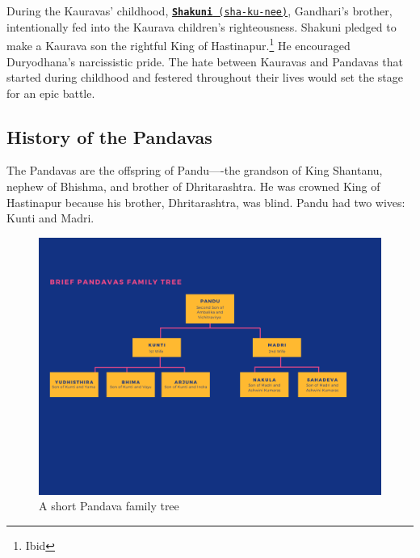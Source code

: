 \documentclass[10pt, letterpaper]{article}
\begin{document}
During the Kauravas' childhood,
\texttt{\underline{\href{https://drive.google.com/file/d/1W6-9A5tCvrCfKQBv-zHQ1JtPp9EI0-eM/view?usp=sharing}{\textbf{Shakuni}}
(sha-ku-nee)}}, Gandhari's brother, intentionally fed into the Kaurava
children's righteousness. Shakuni pledged to make a Kaurava son the
rightful King of Hastinapur.\footnote{Ibid} He encouraged Duryodhana's
narcissistic pride. The hate between Kauravas and Pandavas that started
during childhood and festered throughout their lives would set the stage
for an epic battle. \\


\subsection{History of the Pandavas}

The Pandavas are the offspring of Pandu----the grandson of King
Shantanu, nephew of Bhishma, and brother of Dhritarashtra. He was
crowned King of Hastinapur because his brother, Dhritarashtra, was
blind. Pandu had two wives: Kunti and Madri. \\

\begin{figure}
\centering
\includegraphics[scale = 0.25]{image2.png}
\caption{A short Pandava family tree}
\end{figure}
\end{document}
